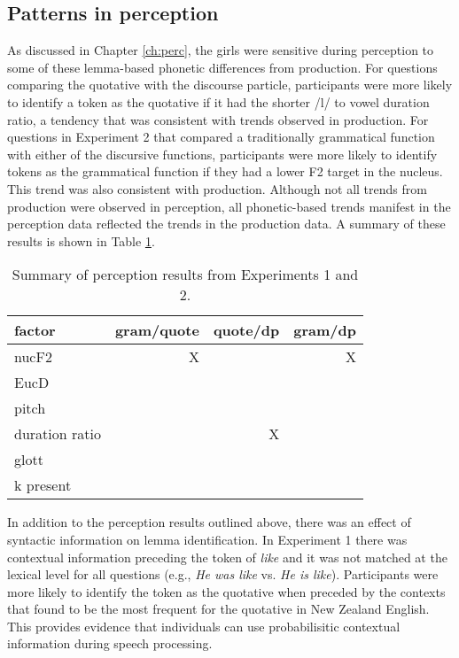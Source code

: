 \subsection{Patterns in perception}
As discussed in Chapter \ref{ch:perc}, the girls were sensitive during perception to some of these lemma-based phonetic differences from production.  For questions comparing the quotative with the discourse particle, participants were more likely to identify a token as the quotative if it had the shorter /l/ to vowel duration ratio, a tendency that was consistent with trends observed in production.  For questions in Experiment 2 that compared a traditionally grammatical function with either of the discursive functions, participants were more likely to identify tokens as the grammatical function if they had a lower F2 target in the nucleus.  This trend was also consistent with production.  Although not all trends from production were observed in perception, all phonetic-based trends manifest in the perception data reflected the trends in the production data.  A summary of these results is shown in Table \ref{tab:sumpercresults}.   




\begin{table}[ht]
\begin{center}
\begin{tabular}{lrrr}
  \hline
 factor & gram/quote & quote/dp & gram/dp  \\
 \hline
  nucF2        &   X  & &  X  \\
 EucD   			&     &   	&   \\
 pitch        &     &     &  \\
  duration ratio &    &  X  & \\
 glott        &      &    &  \\
 k present  &    &  &  \\

  \hline

\end{tabular}
\caption{Summary of perception results from Experiments 1 and 2.}
\label{tab:sumpercresults}
\end{center}
\end{table}

In addition to the perception results outlined above, there was an effect of syntactic information on lemma identification.  In Experiment 1 there was contextual information preceding the token of \textit{like} and it was not matched at the lexical level for all questions (e.g., \textit{He was like} vs. \textit{He is like}).  Participants were more likely to identify the token as the quotative when preceded by the contexts that  found to be the most frequent for the quotative in New Zealand English.  This provides evidence that individuals can use probabilisitic contextual information during speech processing.

